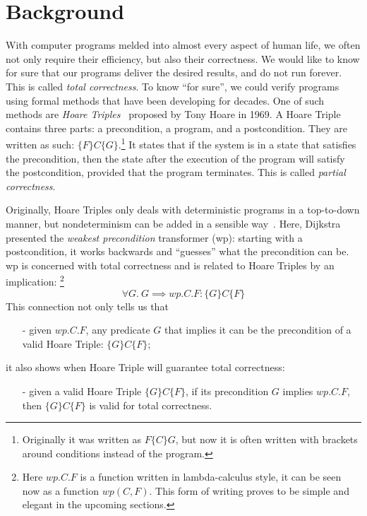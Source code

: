 \chapter{Background}\label{ch:background}

With computer programs melded into almost every aspect of human life, we often not only require their efficiency, but also their correctness. 
We would like to know for sure that our programs deliver the desired results, and do not run forever. 
This is called \textit{total correctness}. 
To know ``for sure'', we could verify programs using formal methods that have been developing for decades. 
One of such methods are \textit{Hoare Triples}~\cite{Hoare1969} proposed by Tony Hoare in 1969. 
A Hoare Triple contains three parts: a precondition, a program, and a postcondition. 
They are written as such: $\{F\}C\{G\}$.\footnote{Originally it was written as $F \{C\} G$, but now it is often written with brackets around conditions instead of the program.} 
It states that if the system is in a state that satisfies the precondition, then the state after the execution of the program will satisfy the postcondition, provided that the program terminates.
This is called \textit{partial correctness}. 

Originally, Hoare Triples only deals with deterministic programs in a top-to-down manner, but nondeterminism can be added in a sensible way~\cite{Dijkstra1975}. 
Here, Dijkstra presented the \textit{weakest precondition} transformer (wp): starting with a postcondition, it works backwards and ``guesses'' what the precondition can be. 
wp is concerned with total correctness and is related to Hoare Triples by an implication: 
\footnote{Here $wp.C.F$ is a function written in lambda-calculus style, it can be seen now as a function $wp(C,F)$. This form of writing proves to be simple and elegant in the upcoming sections.}
\[\forall G.\ G\implies wp.C.F: \{G\} C \{F\}\]
This connection not only tells us that 
\begin{itemize}
    \item[-] given $wp.C.F$, any predicate $G$ that implies it can be the precondition of a valid Hoare Triple: $\{G\} C \{F\}$; 
\end{itemize}
it also shows when Hoare Triple will guarantee total correctness: 
\begin{itemize}
    \item[-] given a valid Hoare Triple $\{G\} C \{F\}$, if its precondition $G$ implies $wp.C.F$, then $\{G\} C \{F\}$ is valid for total correctness. 
\end{itemize}

